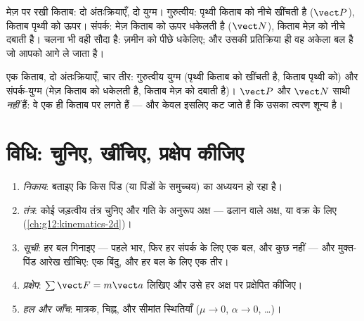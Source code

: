 \begin{example}[किताब, मेज़ और पृथ्वी]\label{ex:g12:newtons-laws:book}
मेज़ पर रखी किताब: दो अंतःक्रियाएँ, दो युग्म। गुरुत्वीय: पृथ्वी किताब को नीचे
खींचती है ($\vect P$), किताब पृथ्वी को ऊपर। संपर्क: मेज़ किताब को ऊपर धकेलती है
($\vect N$), किताब मेज़ को नीचे दबाती है। चलना भी वही सौदा है: ज़मीन को पीछे
धकेलिए; और उसकी प्रतिक्रिया ही वह अकेला बल है जो आपको आगे ले जाता है।
\end{example}

\begin{omfigure}

{\small एक किताब, दो अंतःक्रियाएँ, चार तीर: गुरुत्वीय युग्म (पृथ्वी किताब को
खींचती है, किताब पृथ्वी को) और संपर्क-युग्म (मेज़ किताब को धकेलती है, किताब
मेज़ को दबाती है)। $\vect P$ और $\vect N$ साथी \emph{नहीं} हैं: वे एक ही किताब पर
लगते हैं --- और केवल इसलिए कट जाते हैं कि उसका त्वरण शून्य है।}
\end{omfigure}

\section{विधि: चुनिए, खींचिए, प्रक्षेप कीजिए}

\begin{method}\label{met:g12:newtons-laws:method}
\begin{enumerate}
  \item \emph{निकाय}: बताइए कि किस पिंड (या पिंडों के समुच्चय) का अध्ययन हो
        रहा है।
  \item \emph{तंत्र}: कोई जड़त्वीय तंत्र चुनिए और गति के अनुरूप अक्ष ---
        ढलान वाले अक्ष, या वक्र के लिए  (\cref{ch:g12:kinematics-2d})।
  \item \emph{सूची}: हर बल गिनाइए --- पहले भार, फिर हर संपर्क
        के लिए एक बल, और कुछ नहीं --- और मुक्त-पिंड आरेख खींचिए: एक
        बिंदु, और हर बल के लिए एक तीर।
  \item \emph{प्रक्षेप}: $\sum \vect F = m\vect a$ लिखिए और उसे हर अक्ष पर प्रक्षेपित कीजिए।
  \item \emph{हल और जाँच}: मात्रक, चिह्न, और सीमांत स्थितियाँ
        ($\mu \to 0$, $\alpha \to 0$, \dots)।
\end{enumerate}
\end{method}

